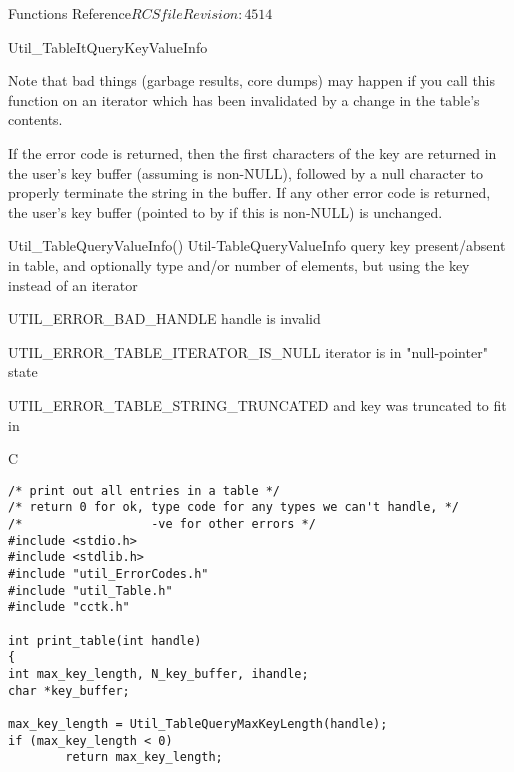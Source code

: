 \begin{cactuspart}{ Functions Reference}{$RCSfile$}{$Revision: 4514 $}
\begin{FunctionDescription}{Util\_TableItQueryKeyValueInfo}
\begin{Discussion}
Note that bad things (garbage results, core dumps) may happen if
you call this function on an iterator which has been invalidated
by a change in the table's contents.

If the error code  is returned,
then the first  characters of the key are
returned in the user's key buffer (assuming  is non-NULL),
followed by a null character to properly terminate the string in the
buffer.  If any other error code is returned, the user's key buffer
(pointed to by  if this is non-NULL) is unchanged.
\end{Discussion}

\begin{SeeAlsoSection}
\begin{SeeAlso2} {Util\_TableQueryValueInfo()} {Util-TableQueryValueInfo}
query key present/absent in table, and optionally type and/or number
of elements, but using the key instead of an iterator
\end{SeeAlso2}
\end{SeeAlsoSection}

\begin{ErrorSection}
\begin{Error}{UTIL\_ERROR\_BAD\_HANDLE}
handle is invalid
\end{Error}
\begin{Error}{UTIL\_ERROR\_TABLE\_ITERATOR\_IS\_NULL}
\quad
iterator is in "null-pointer" state
\end{Error}
\begin{Error}{UTIL\_ERROR\_TABLE\_STRING\_TRUNCATED}
\quad
{} and key was truncated to fit in 
\end{Error}
\end{ErrorSection}

\begin{ExampleSection}
\begin{Example}{C}
\begin{verbatim}
/* print out all entries in a table */
/* return 0 for ok, type code for any types we can't handle, */
/*                  -ve for other errors */
#include <stdio.h>
#include <stdlib.h>
#include "util_ErrorCodes.h"
#include "util_Table.h"
#include "cctk.h"

int print_table(int handle)
{
int max_key_length, N_key_buffer, ihandle;
char *key_buffer;

max_key_length = Util_TableQueryMaxKeyLength(handle);
if (max_key_length < 0)
        return max_key_length;


\end{verbatim}
\end{Example}
\end{ExampleSection}
\end{FunctionDescription}
\end{cactuspart}
